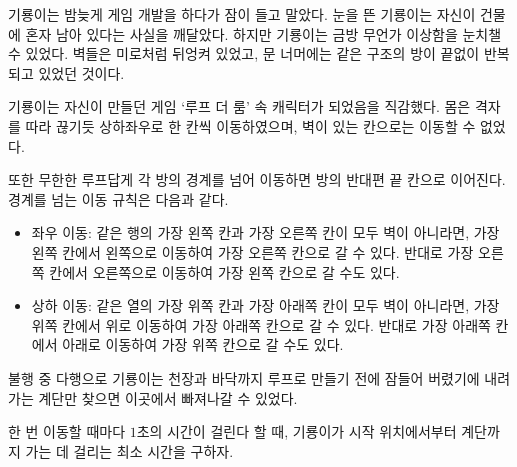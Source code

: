 기룡이는 밤늦게 게임 개발을 하다가 잠이 들고 말았다. 
눈을 뜬 기룡이는 자신이 건물에 혼자 남아 있다는 사실을 깨달았다.
하지만 기룡이는 금방 무언가 이상함을 눈치챌 수 있었다.
벽들은 미로처럼 뒤엉켜 있었고, 문 너머에는 같은 구조의 방이 끝없이 반복되고 있었던 것이다.

기룡이는 자신이 만들던 게임 `루프 더 룸' 속 캐릭터가 되었음을 직감했다. 
몸은 격자를 따라 끊기듯 상하좌우로 한 칸씩 이동하였으며, 벽이 있는 칸으로는 이동할 수 없었다.

또한 무한한 루프답게 각 방의 경계를 넘어 이동하면 방의 반대편 끝 칸으로 이어진다. 
경계를 넘는 이동 규칙은 다음과 같다.
\begin{itemize}
  \item 좌우 이동: 같은 행의 가장 왼쪽 칸과 가장 오른쪽 칸이 모두 벽이 아니라면, 가장 왼쪽 칸에서 왼쪽으로 이동하여 가장 오른쪽 칸으로 갈 수 있다. 반대로 가장 오른쪽 칸에서 오른쪽으로 이동하여 가장 왼쪽 칸으로 갈 수도 있다.
  \item 상하 이동: 같은 열의 가장 위쪽 칸과 가장 아래쪽 칸이 모두 벽이 아니라면, 가장 위쪽 칸에서 위로 이동하여 가장 아래쪽 칸으로 갈 수 있다. 반대로 가장 아래쪽 칸에서 아래로 이동하여 가장 위쪽 칸으로 갈 수도 있다.
\end{itemize}

불행 중 다행으로 기룡이는 천장과 바닥까지 루프로 만들기 전에 잠들어 버렸기에 내려가는 계단만 찾으면 이곳에서 빠져나갈 수 있었다.

한 번 이동할 때마다 $1$초의 시간이 걸린다 할 때, 기룡이가 시작 위치에서부터 계단까지 가는 데 걸리는 최소 시간을 구하자.